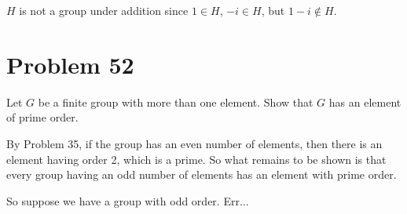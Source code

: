 \documentclass{article}
\begin{document}
$H$ is not a group under addition since $1\in H$, $-i\in H$, but $1-i\not\in H$.

\section*{Problem 52}

Let $G$ be a finite group with more than one element.
Show that $G$ has an element of prime order.

By Problem 35, if the group has an even number of elements, then there
is an element having order 2, which is a prime.  So what remains to be shown
is that every group having an odd number of elements has an element with
prime order.

So suppose we have a group with odd order.  Err...
\end{document}
